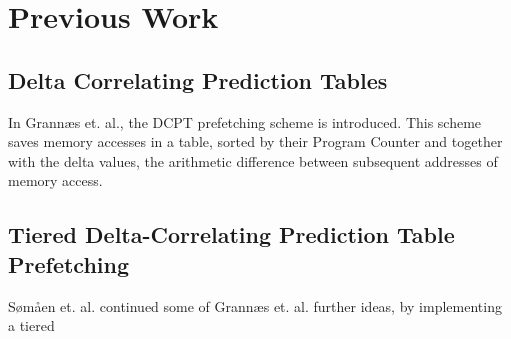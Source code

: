 \section{Previous Work}

\subsection{Delta Correlating Prediction Tables}
In Grannæs et. al.\cite{Grannaes481837}, the DCPT prefetching scheme is
introduced. This scheme saves memory accesses in a table, sorted by their
Program Counter and together with the delta values, the arithmetic difference
between subsequent addresses of memory access. 

\subsection{Tiered Delta-Correlating Prediction Table Prefetching}
Sømåen et. al.\cite{Somaen} continued some of Grannæs et. al. further ideas, by
implementing a tiered 


